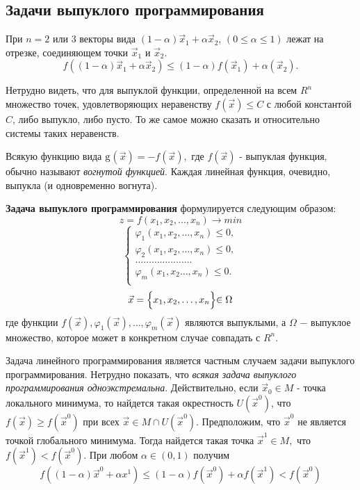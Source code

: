 \subsection{Задачи выпуклого программирования}

\indent\indent{}


При $n = 2$ или $3$ векторы вида  $(1 - \alpha)\vec x_1 + \alpha \vec x_2$, $(0 \leqslant \alpha \leqslant 1)$  лежат на отрезке, соединяющем точки $\vec x_1$ и  $\vec x_2$.
$$f((1 - \alpha)\vec x_1 + \alpha \vec x_2) \leqslant (1-\alpha)f(\vec x_1)+ \alpha(\vec x_2).$$


Нетрудно видеть, что для выпуклой функции, определенной на всем $R^n$ множество точек, удовлетворяющих неравенству $f(\vec x) \leqslant C$ с
любой константой $C$, либо выпукло, либо пусто. То же самое можно сказать и относительно системы таких неравенств.

Всякую функцию вида $\rm g$$(\vec x) =- f(\vec x), $ где $f(\vec x)$ - выпуклая функция, обычно называют \textit{вогнутой функцией}. Каждая линейная
функция, очевидно, выпукла (и одновременно вогнута).

\textbf{Задача выпуклого программирования} формулируется следующим образом:
\[ z = f(x_1,x_2,\dots,x_n) \to min\]
\[
    \begin{cases}
        \varphi_1(x_1,x_2,\dots,x_n)\leqslant 0,\\
        \varphi_2(x_1,x_2,\dots,x_n)\leqslant 0,\\
        \dots\dots\dots\dots\dots\dots\dots\\
        \varphi_m(x_1,x_2\dots,x_n)\leqslant 0.\\
    \end{cases}
\]
\[\vec x  = \Bigl\{x_1,x_2,\dots,x_n\Bigl\} \in \Omega\]
где функции  $f(\vec x),\varphi_1(\vec x),\dots, \varphi_m(\vec x)$ являются выпуклыми, а $\Omega$ $-$ выпуклое множество, которое может в конкретном случае совпадать с $R^n$.

Задача линейного программирования является частным случаем задачи выпуклого программирования. Нетрудно показать, что \textit{всякая задача выпуклого программирования одноэкстремальна}.
Действительно, если $\vec x_0 \in M$ - точка локального минимума, то найдется такая окрестность $U(\vec x^0)$, что $f(\vec x) \geqslant f(\vec x^0)$
при всех $\vec x \in M \cap U(\vec x^0)$. Предположим, что $\vec x^0$ не является точкой глобального минимума. Тогда найдется такая точка
$\vec x^1 \in M,$ что $f(\vec x^1) < f(\vec x^0)$. При любом $\alpha \in (0,1)$ получим
\[
  f((1 - \alpha)\vec x^0 + \alpha x^1) \leqslant (1 - \alpha) f(\vec x^0) + \alpha f(\vec x^1) < f(\vec x^0)
\]

